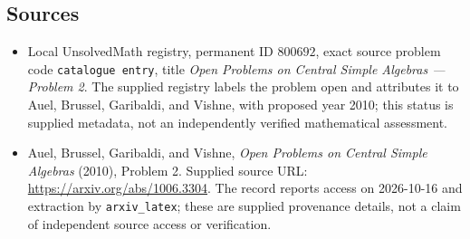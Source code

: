 \documentclass[11pt]{article}
\begin{document}
\subsection{Sources}
\begin{itemize}
\item Local UnsolvedMath registry, permanent ID \(800692\), exact source problem code \texttt{catalogue entry}, title \emph{Open Problems on Central Simple Algebras --- Problem 2}. The supplied registry labels the problem open and attributes it to Auel, Brussel, Garibaldi, and Vishne, with proposed year 2010; this status is supplied metadata, not an independently verified mathematical assessment.
\item Auel, Brussel, Garibaldi, and Vishne, \emph{Open Problems on Central Simple Algebras} (2010), Problem 2. Supplied source URL: \url{https://arxiv.org/abs/1006.3304}. The record reports access on 2026-10-16 and extraction by \texttt{arxiv\_latex}; these are supplied provenance details, not a claim of independent source access or verification.
\end{itemize}
\end{document}
